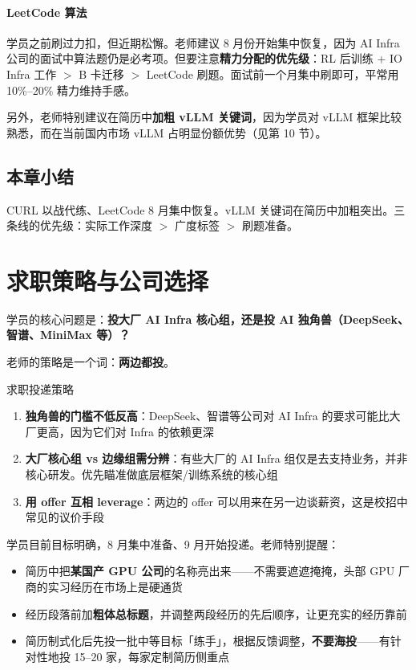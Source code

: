 \documentclass[a4paper]{article}
\begin{document}
\paragraph{LeetCode 算法}学员之前刷过力扣，但近期松懈。老师建议 8 月份开始集中恢复，因为 AI Infra 公司的面试中算法题仍是必考项。但要注意\textbf{精力分配的优先级}：RL 后训练 + IO Infra 工作 $>$ B 卡迁移 $>$ LeetCode 刷题。面试前一个月集中刷即可，平常用 10\%--20\% 精力维持手感。

另外，老师特别建议在简历中\textbf{加粗 vLLM 关键词}，因为学员对 vLLM 框架比较熟悉，而在当前国内市场 vLLM 占明显份额优势（见第 10 节）。

\subsection{本章小结}
CURL 以战代练、LeetCode 8 月集中恢复。vLLM 关键词在简历中加粗突出。三条线的优先级：实际工作深度 $>$ 广度标签 $>$ 刷题准备。


\section{求职策略与公司选择}

学员的核心问题是：\textbf{投大厂 AI Infra 核心组，还是投 AI 独角兽（DeepSeek、智谱、MiniMax 等）？}

老师的策略是一个词：\textbf{两边都投}。

\begin{importantbox}{求职投递策略}
\begin{enumerate}
\item \textbf{独角兽的门槛不低反高}：DeepSeek、智谱等公司对 AI Infra 的要求可能比大厂更高，因为它们对 Infra 的依赖更深
\item \textbf{大厂核心组 vs 边缘组需分辨}：有些大厂的 AI Infra 组仅是去支持业务，并非核心研发。优先瞄准做底层框架/训练系统的核心组
\item \textbf{用 offer 互相 leverage}：两边的 offer 可以用来在另一边谈薪资，这是校招中常见的议价手段
\end{enumerate}
\end{importantbox}

学员目前目标明确，8 月集中准备、9 月开始投递。老师特别提醒：

\begin{itemize}
\item 简历中把\textbf{某国产 GPU 公司}的名称亮出来——不需要遮遮掩掩，头部 GPU 厂商的实习经历在市场上是硬通货
\item 经历段落前加\textbf{粗体总标题}，并调整两段经历的先后顺序，让更充实的经历靠前
\item 简历制式化后先投一批中等目标「练手」，根据反馈调整，\textbf{不要海投}——有针对性地投 15--20 家，每家定制简历侧重点
\end{itemize}
\end{document}
